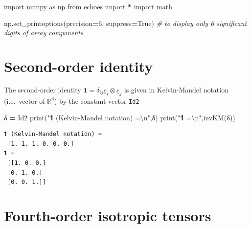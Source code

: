 \documentclass[
  a4paper,
  numbers=noendperiod,
  DIV=12]{scrreprt}
\newenvironment{Shaded}{\begin{snugshade}}{\end{snugshade}}
\newcommand{\BuiltInTok}[1]{#1}
\newcommand{\CharTok}[1]{\textcolor[rgb]{0.31,0.60,0.02}{#1}}
\newcommand{\CommentTok}[1]{\textcolor[rgb]{0.56,0.35,0.01}{\textit{#1}}}
\newcommand{\DecValTok}[1]{\textcolor[rgb]{0.00,0.00,0.81}{#1}}
\newcommand{\ImportTok}[1]{#1}
\newcommand{\NormalTok}[1]{#1}
\newcommand{\OperatorTok}[1]{\textcolor[rgb]{0.81,0.36,0.00}{\textbf{#1}}}
\newcommand{\StringTok}[1]{\textcolor[rgb]{0.31,0.60,0.02}{#1}}
\newcommand{\VariableTok}[1]{\textcolor[rgb]{0.00,0.00,0.00}{#1}}
\newcommand{\R}{{\mathbb{{R}}}}
\newcommand{\uu}[1]{{\symbf{{#1}}}}
\newcommand{\uv}[1]{{\underline{{#1}}}}
\newcommand{\ve}[1]{{\uv{{e}}_{{#1}}}}
\begin{document}
\begin{tcolorbox}[enhanced jigsaw, arc=.35mm, bottomrule=.15mm, bottomtitle=1mm, breakable, colback=white, colbacktitle=quarto-callout-tip-color!10!white, colframe=quarto-callout-tip-color-frame, coltitle=black, left=2mm, leftrule=.75mm, opacityback=0, opacitybacktitle=0.6, rightrule=.15mm, title={Imports}, titlerule=0mm, toprule=.15mm, toptitle=1mm]

\begin{Shaded}
\begin{Highlighting}[]
\ImportTok{import}\NormalTok{ numpy }\ImportTok{as}\NormalTok{ np}
\ImportTok{from}\NormalTok{ echoes }\ImportTok{import} \OperatorTok{*}
\ImportTok{import}\NormalTok{ math}

\NormalTok{np.set\_printoptions(precision}\OperatorTok{=}\DecValTok{6}\NormalTok{, suppress}\OperatorTok{=}\VariableTok{True}\NormalTok{)}
\CommentTok{\# to display only 6 significant digits of array components}
\end{Highlighting}
\end{Shaded}

\end{tcolorbox}

\section{Second-order identity}\label{second-order-identity}

The second-order identity \(\uu{1}=\delta_{ij}\ve{i}\otimes\ve{j}\) is
given in Kelvin-Mandel notation (i.e.~vector of \(\R^6\)) by the
constant vector \texttt{Id2}

\begin{Shaded}
\begin{Highlighting}[]
\NormalTok{δ }\OperatorTok{=}\NormalTok{ Id2}
\BuiltInTok{print}\NormalTok{(}\StringTok{"𝟏 (Kelvin{-}Mandel notation) =}\CharTok{\textbackslash{}n}\StringTok{"}\NormalTok{,δ)}
\BuiltInTok{print}\NormalTok{(}\StringTok{"𝟏 =}\CharTok{\textbackslash{}n}\StringTok{"}\NormalTok{,invKM(δ))}
\end{Highlighting}
\end{Shaded}

\begin{verbatim}
𝟏 (Kelvin-Mandel notation) =
 [1. 1. 1. 0. 0. 0.]
𝟏 =
 [[1. 0. 0.]
 [0. 1. 0.]
 [0. 0. 1.]]
\end{verbatim}

\section{Fourth-order isotropic
tensors}\label{fourth-order-isotropic-tensors}
\end{document}

